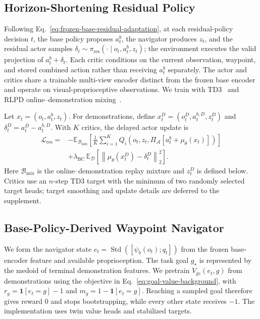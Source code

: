 \documentclass[letterpaper]{article} %
\begin{document}
\subsection{Horizon-Shortening Residual Policy}
\label{sec:hier}
Following Eq.~\eqref{eq:frozen-base-residual-adaptation}, at each residual-policy
decision $t$, the base policy proposes $a_t^b$, the navigator produces
$z_t$, and the residual actor samples
$\delta_t\sim\pi_{\mathrm{res}}(\cdot\mid o_t,a_t^b,z_t)$; the
environment executes the valid projection of $a_t^b+\delta_t$. Each critic
conditions on the current observation, waypoint, and stored combined action
rather than receiving $a_t^b$ separately. The actor and critics share a
trainable multi-view encoder distinct from the frozen base encoder and operate
on visual-proprioceptive observations. We train with
TD3~\cite{fujimoto2018addressing} and RLPD online--demonstration
mixing~\cite{ball2023efficient}.

Let $x_t=(o_t,a_t^b,z_t)$. For demonstrations, define
$x_t^D=(o_t^D,a_t^{b,D},z_t^D)$ and
$\delta_t^D=a_t^D-a_t^{b,D}$. With $K$ critics, the delayed actor update is
\begin{equation}
\begin{aligned}
\mathcal L_{\mathrm{res}}
={}&-\mathbb E_{\mathcal B_{\mathrm{mix}}}\!\left[
 \frac{1}{K}\sum_{i=1}^{K}
 Q_i\!\left(o_t,z_t,
 \Pi_{\mathcal A}[a_t^b+\mu_\theta(x_t)]\right)\right]\\
&+\lambda_{\mathrm{BC}}\,
\mathbb E_{\mathcal D}\!\left[
\left\|\mu_\theta(x_t^D)-\delta_t^D\right\|_2^2\right].
\end{aligned}
\label{eq:residual-actor-objective}
\end{equation}
Here $\mathcal B_{\mathrm{mix}}$ is the online--demonstration replay mixture
and $z_t^D$ is defined below. Critics use an $n$-step TD3 target with the
minimum of two randomly selected target heads; target smoothing and update
details are deferred to the supplement.

\subsection{Base-Policy-Derived Waypoint Navigator}
\label{sec:value}
We form the navigator state
$e_t=\operatorname{Std}([\psi_b(o_t);q_t])$ from the frozen
base-encoder feature and available proprioception. The task goal $g_\star$ is
represented by the medoid of terminal
demonstration features. We pretrain $V_{\mathrm{gc}}(e_t,g)$ from
demonstrations using the objective in
Eq.~\eqref{eq:goal-value-background}, with
$r_g=\mathbf 1[e_t=g]-1$ and $m_g=1-\mathbf 1[e_t=g]$. Reaching a sampled
goal therefore gives reward $0$ and stops bootstrapping, while every other
state receives $-1$. The implementation uses twin value heads and stabilized targets.
\end{document}
